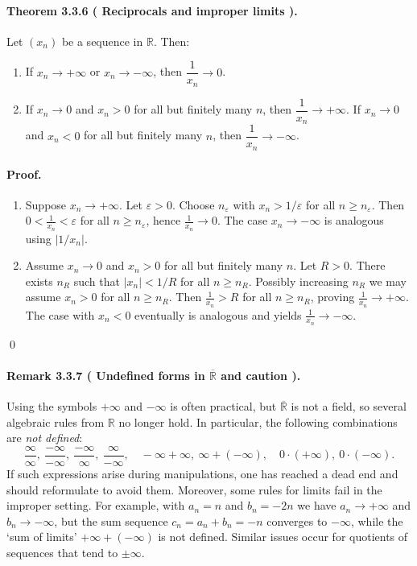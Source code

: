 \documentclass[12pt,a4paper]{article}
\newcommand{\R}{\mathbb{R}}
\newcommand{\eps}{\varepsilon}
\newcommand{\NumberedTheorem}[3]{%
\paragraph*{Theorem #1 ( #2 ).} #3\par}
\newcommand{\NumberedRemark}[3]{%
\paragraph*{Remark #1 ( #2 ).} #3\par}
\theoremstyle{plain}
\theoremstyle{definition}
\theoremstyle{remark}
\begin{document}
\NumberedTheorem{3.3.6}{Reciprocals and improper limits}{Let $(x_n)$ be a sequence in $\R$. Then:
\begin{enumerate}[label={(\arabic*)}, leftmargin=*]
	\item If $x_n\to +\infty$ or $x_n\to -\infty$, then $\dfrac{1}{x_n}\to 0$.
	\item If $x_n\to 0$ and $x_n>0$ for all but finitely many $n$, then $\dfrac{1}{x_n}\to +\infty$. If $x_n\to 0$ and $x_n<0$ for all but finitely many $n$, then $\dfrac{1}{x_n}\to -\infty$.
\end{enumerate}}

\paragraph{Proof.}
\begin{enumerate}[label={(\arabic*)}, leftmargin=*]
	\item Suppose $x_n\to +\infty$. Let $\eps>0$. Choose $n_\eps$ with $x_n>1/\eps$ for all $n\ge n_\eps$. Then $0<\tfrac{1}{x_n}<\eps$ for all $n\ge n_\eps$, hence $\tfrac{1}{x_n}\to 0$. The case $x_n\to -\infty$ is analogous using $|1/x_n|$.
	\item Assume $x_n\to 0$ and $x_n>0$ for all but finitely many $n$. Let $R>0$. There exists $n_R$ such that $|x_n|<1/R$ for all $n\ge n_R$. Possibly increasing $n_R$ we may assume $x_n>0$ for all $n\ge n_R$. Then $\tfrac{1}{x_n}>R$ for all $n\ge n_R$, proving $\tfrac{1}{x_n}\to +\infty$. The case with $x_n<0$ eventually is analogous and yields $\tfrac{1}{x_n}\to -\infty$.
\end{enumerate}\qed

\NumberedRemark{3.3.7}{Undefined forms in $\overline{\R}$ and caution}{Using the symbols $+\infty$ and $-\infty$ is often practical, but $\overline{\R}$ is not a field, so several algebraic rules from $\R$ no longer hold. In particular, the following combinations are \emph{not defined}:
\[
	\frac{\infty}{\infty},\ \frac{-\infty}{-\infty},\ \frac{-\infty}{\infty},\ \frac{\infty}{-\infty},\quad
	-\infty + \infty,\ \infty + (-\infty),\quad 0\cdot(+\infty),\ 0\cdot(-\infty).
\]
If such expressions arise during manipulations, one has reached a dead end and should reformulate to avoid them. Moreover, some rules for limits fail in the improper setting. For example, with $a_n=n$ and $b_n=-2n$ we have $a_n\to +\infty$ and $b_n\to -\infty$, but the sum sequence $c_n=a_n+b_n=-n$ converges to $-\infty$, while the `sum of limits' $+\infty+(-\infty)$ is not defined. Similar issues occur for quotients of sequences that tend to $\pm\infty$.}
\end{document}
